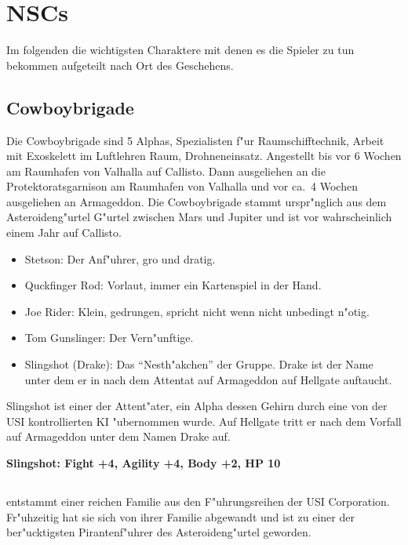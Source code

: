 \section{NSCs}

Im folgenden die wichtigsten Charaktere mit denen es die Spieler zu tun bekommen aufgeteilt nach Ort des Geschehens.

\subsection{Cowboybrigade}

Die Cowboybrigade sind 5 Alphas, Spezialisten f"ur Raumschifftechnik, Arbeit mit Exoskelett im Luftlehren Raum, Drohneneinsatz.
Angestellt bis vor 6 Wochen am Raumhafen von Valhalla auf Callisto. Dann ausgeliehen an die Protektoratsgarnison am Raumhafen von Valhalla und vor ca.~4 Wochen ausgeliehen an Armageddon. Die Cowboybrigade stammt urspr"nglich aus dem Asteroideng"urtel G"urtel zwischen Mars und Jupiter und ist vor wahrscheinlich einem Jahr auf Callisto.

\begin{itemize}
    \item Stetson: Der Anf"uhrer, gro\3 und dratig.
    \item Quckfinger Rod: Vorlaut, immer ein Kartenspiel in der Hand.
    \item Joe Rider: Klein, gedrungen, spricht nicht wenn nicht unbedingt n"otig.
    \item Tom Gunslinger: Der Vern"unftige.
    \item Slingshot (Drake): Das ``Nesth"akchen'' der Gruppe. Drake ist der Name unter dem er in nach dem Attentat auf Armageddon auf Hellgate auftaucht.
\end{itemize}

Slingshot ist einer der Attent"ater, ein Alpha dessen Gehirn durch eine von der USI kontrollierten KI "ubernommen wurde.
Auf Hellgate tritt er nach dem Vorfall auf Armageddon unter dem Namen Drake auf.

\textbf{Slingshot: Fight +4, Agility +4, Body +2, HP 10}

\newpage

\subsection[\pinyin{Wang Xiao Long}]{  }

   entstammt einer reichen Familie aus den F"uhrungsreihen der USI Corporation. Fr"uhzeitig hat sie sich von ihrer Familie abgewandt und ist zu einer der ber"ucktigsten Pirantenf"uhrer des Asteroideng"urtel geworden. 

